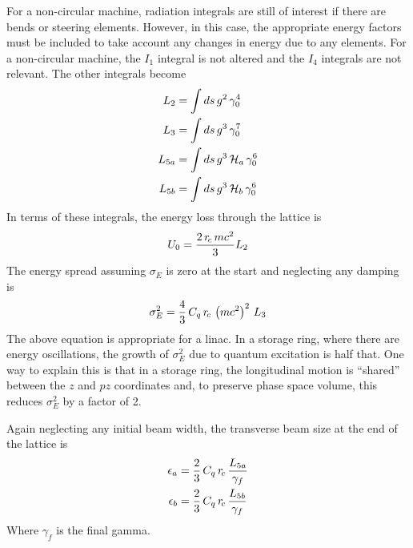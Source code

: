 For a non-circular machine, radiation integrals are still of interest
if there are bends or steering elements. However, in this case, the
appropriate energy factors must be included to take account any
changes in energy due to any  elements.  For a
non-circular machine, the $I_1$ integral is not altered and the $I_4$
integrals are not relevant. The other integrals become
  \begin{align}
    L_2 &= \int ds \, g^2 \, \gamma_0^4 \\
    L_3 &= \int ds \, g^3 \, \gamma_0^7 \\
    L_{5a} &= \int ds \, g^3 \, {\cal H}_a \, \gamma_0^6 \\
    L_{5b} &= \int ds \, g^3 \, {\cal H}_b \, \gamma_0^6
  \end{align}
In terms of these integrals, the energy loss through the lattice is
  \begin{equation}
    U_0 = \frac{2 \, r_{\!c} \, mc^2}{3} L_2
  \end{equation}
The energy spread assuming $\sigma_E$ is zero at the start and neglecting
any damping is
  \begin{equation}
    \sigma_E^2 = \frac{4}{3} \, C_q \, r_{\!c} \, \left( m c^2 \right)^2 \, L_3
  \end{equation}
The above equation is appropriate for a linac. In a storage ring, where
there are energy oscillations, the growth of $\sigma_E^2$ due to
quantum excitation is half that. One way to explain this is that in a
storage ring, the longitudinal motion is ``shared'' between the $z$ and
$pz$ coordinates and, to preserve phase space volume, this reduces
$\sigma_E^2$ by a factor of 2.

Again neglecting any initial beam width, the transverse beam size
at the end of the lattice is
  \begin{align}
    \epsilon_a &= \frac{2}{3} \, C_q \, r_{\!c} \, 
    \frac{L_{5a}}{\gamma_f} \nonumber \\
    \epsilon_b &= \frac{2}{3} \, C_q \, r_{\!c} \, 
    \frac{L_{5b}}{\gamma_f} 
  \end{align}
Where $\gamma_f$ is the final gamma.
